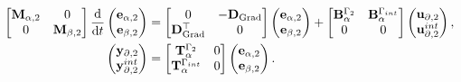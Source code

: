 \documentclass[11pt,a4paper]{article}
\DeclareMathOperator*{\Grad}{Grad}
\begin{document}
\begin{equation}
    \begin{split}
        \begin{bmatrix}
            \mathbf{M}_{\alpha, 2} & 0 \\
            0 & \mathbf{M}_{\beta, 2}
        \end{bmatrix}\odv{}{t}
        \begin{pmatrix}
            \mathbf{e}_{\alpha,2} \\
            \mathbf{e}_{\beta,2}
        \end{pmatrix} &= 
        \begin{bmatrix}
            0 & -\mathbf{D}_{\Grad} \\
            \mathbf{D}_{\Grad}^\top & 0 
        \end{bmatrix}
        \begin{pmatrix}
            \mathbf{e}_{\alpha,2} \\
            \mathbf{e}_{\beta,2}
        \end{pmatrix} + 
        \begin{bmatrix}
            \mathbf{B}_\alpha^{\Gamma_2} & \mathbf{B}_\alpha^{\Gamma_{\rm int}} \\
            0 & 0
        \end{bmatrix}
        \begin{pmatrix}
            \mathbf{u}_{\partial,2} \\
            \mathbf{u}_{\partial,2}^{\rm int}
        \end{pmatrix}, \\
        \begin{pmatrix}
            \mathbf{y}_{\partial,2} \\
            \mathbf{y}_{\partial,2}^{\rm int}
        \end{pmatrix} &= 
        \begin{bmatrix}
            \mathbf{T}_\alpha^{\Gamma_2} & 0 \\
            \mathbf{T}_\alpha^{\Gamma_{\rm int}} & 0
        \end{bmatrix}
        \begin{pmatrix}
            \mathbf{e}_{\alpha,2} \\
            \mathbf{e}_{\beta,2}
        \end{pmatrix}.
        \end{split}
\end{equation}
\end{document}
